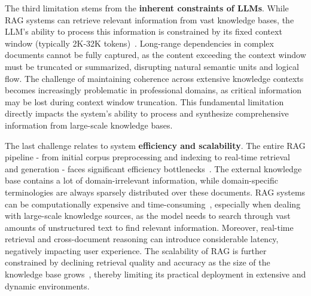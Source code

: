 \documentclass[lettersize,journal]{IEEEtran}
\begin{document}
The third limitation stems from the \textbf{inherent constraints of LLMs}. While RAG systems can retrieve relevant information from vast knowledge bases, the LLM's ability to process this information is constrained by its fixed context window (typically 2K-32K tokens)~\cite{openai2023gpt4,anthropic2024claude}. Long-range dependencies in complex documents cannot be fully captured, as the content exceeding the context window must be truncated or summarized, disrupting natural semantic units and logical flow. The challenge of maintaining coherence across extensive knowledge contexts becomes increasingly problematic in professional domains, as critical information may be lost during context window truncation. This fundamental limitation directly impacts the system's ability to process and synthesize comprehensive information from large-scale knowledge bases.


The last challenge relates to system \textbf{efficiency and scalability}. The entire RAG pipeline - from initial corpus preprocessing and indexing to real-time retrieval and generation - faces significant efficiency bottlenecks~\cite{edge2024local,guo2024lightrag}. The external knowledge base contains a lot of domain-irrelevant information, while domain-specific terminologies are always sparsely distributed over these documents. RAG systems can be computationally expensive and time-consuming~\cite{edge2024local}, especially when dealing with large-scale knowledge sources, as the model needs to search through vast amounts of unstructured text to find relevant information. 
Moreover, real-time retrieval and cross-document reasoning can introduce considerable latency, negatively impacting user experience. The scalability of RAG is further constrained by declining retrieval quality and accuracy as the size of the knowledge base grows~\cite{guo2024lightrag}, thereby limiting its practical deployment in extensive and dynamic environments.
\end{document}
